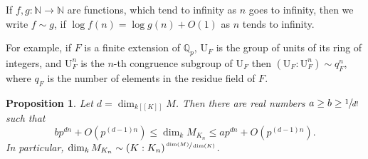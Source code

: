\documentclass[JEP,XML,SOM,Unicode,NoEqCountersInSection]{cedram}
\newtheorem{prop}{Proposition}[section]
\theoremstyle{definition}
\newcommand{\br}[1]{[\![#1]\!]}
\newcommand{\Qp}{\mathbb {Q}_p}
\newcommand{\UU}{\mathrm U}
\begin{document}
If $f, g:\mathbb N\to \mathbb N$ are functions, which tend to infinity as $n$ goes to infinity, then we write $f\sim g$, if $\log f(n)=\log g(n) + O(1)$ as $n$ tends to infinity.

For example,
if $F$ is a finite extension of $\Qp$, $\UU_F$ is the group of units of its ring of integers, and $\UU_F^n$ is the $n$-th congruence subgroup of $\UU_F$ then
$(\UU_F: \UU_F^n)\sim q_F^n$, where $q_F$ is the number of elements in the residue field of $F$.
\begin{prop}\label{growth} Let $d=\dim_{k\br{K}} M$. Then there are real numbers $a\ge b\ge \sfrac{1}{d!}$ such that
\[
bp^{dn} + O(p^{(d-1)n})\le \dim_k M_{K_n}\le ap^{dn} + O(p^{(d-1)n}).
\]
In particular,
$\dim_k M_{K_n}\sim (K: K_n)^{\sfrac{\dim(M)} {\dim (K)}}$.
\end{prop}
\end{document}
